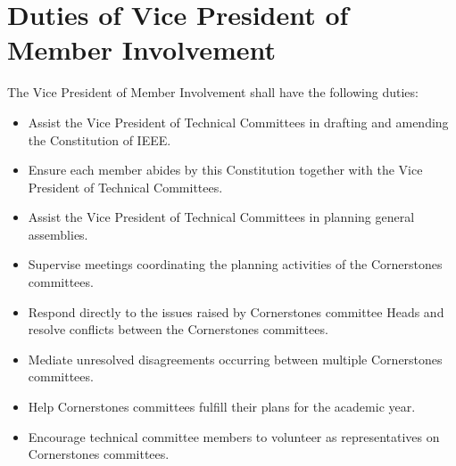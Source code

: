 \documentclass[12pt]{constitution}
\begin{document}
\section{Duties of Vice President of Member Involvement}
\label{sec:officer_vp_Inv}
The Vice President of Member Involvement shall have the following duties:
\begin{itemize}
    \item Assist the Vice President of Technical Committees in drafting and amending the Constitution of IEEE.
    \item Ensure each member abides by this Constitution together with the Vice President of Technical Committees.
    \item Assist the Vice President of Technical Committees in planning general assemblies.
    \item Supervise meetings coordinating the planning activities of the Cornerstones committees.
    \item Respond directly to the issues raised by Cornerstones committee Heads and resolve  conflicts between the Cornerstones committees.
    \item Mediate unresolved disagreements occurring between multiple Cornerstones committees.
    \item Help Cornerstones committees fulfill their plans for the academic year.
    \item Encourage technical committee members to volunteer as representatives on Cornerstones committees.
\end{itemize}
\end{document}
